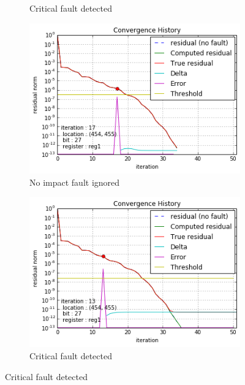 \begin{figure}[h]
\begin{minipage}[b]{0.48\linewidth}
\begin{subfigure}[t]{\linewidth}
		\caption{Critical fault detected}\label{fig:gre_216a_conv_hist_theoretical_detection_1}
	\end{subfigure}
    \end{minipage}
    \quad
    \begin{minipage}[b]{0.48\linewidth}
    	
	\begin{subfigure}[t]{\linewidth}
		\centering
		\includegraphics[width=\linewidth]{figures/pores_2/convergence_history_theoretical_detection_1_1.png}
		\caption{No impact fault ignored}\label{fig:pores_2_conv_hist_theoretical_detection_0}
	\end{subfigure}
    \quad
    \begin{subfigure}[t]{\linewidth}
		\centering
		\includegraphics[width=\linewidth]{figures/pores_2/convergence_history_theoretical_detection_0_1.png}
		\caption{Critical fault detected}\label{fig:pores_2_conv_hist_theoretical_detection_1}
	\end{subfigure}


\end{minipage}
\end{figure}
